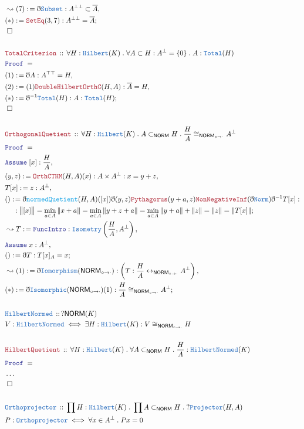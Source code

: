 \documentclass[12pt]{scrartcl}
\newcommand{\TYPE}[1]{\textcolor{NavyBlue}{\mathtt{#1}}}
\newcommand{\FUNC}[1]{\textcolor{Cerulean}{\mathtt{#1}}}
\newcommand{\LOGIC}[1]{\textcolor{Blue}{\mathtt{#1}}}
\newcommand{\THM}[1]{\textcolor{Maroon}{\mathtt{#1}}}
\renewcommand{\.}{\; . \;}
\newcommand{\de}{: \kern 0.1pc =}
\newcommand{\Theorem}[2]{& \THM{#1} \, :: \, #2 \\ & \Proof = \\ }
\newcommand{\DeclareType}[2]{& \TYPE{#1} \, :: \, #2 \\}
\newcommand{\DefineType}[3]{& #1 : \TYPE{#2} \iff #3 \\}
\newcommand{\NewLine}{\\ & \kern 1pc}
\newcommand{\Page}[1]{\begin{align*} #1 \end{align*} \newpage   }
\newcommand{ \bd }{ \ByDef }
\newcommand{\NoProof}{ & \ldots \\ \EndProof}
\newcommand{\ToBij}{\leftrightarrow}
\newcommand{\Say}[3]{& #1 \de #2 : #3, \\}
\newcommand{\Conclude}[3]{& #1 \de #2 : #3; \\}
\newcommand{\Derive}[3]{& \leadsto #1 \de #2 : #3, \\}
\newcommand{\A}{\LOGIC{Assume} \;}
\newcommand{\Assume}[2]{& \A #1 : #2, \\}
\newcommand{\QED}{\; \square}
\newcommand{\EndProof}{& \QED \\}
\newcommand{\ByDef}{\eth}
\newcommand{\Proof}{\LOGIC{Proof} \; }
\newcommand{\Hilbert}{\TYPE{Hilbert}}
\newcommand{\NORM}{\textsf{NORM}}
\newcommand{\NORMI}{{\textsf{NORM}_{\circ \to \cdot}}}
\begin{document}
\Page{
\Derive{(7)}{\bd \TYPE{Subset}}{A^{\bot \bot} \subset \overline{A}}
\Conclude{(*)}{\THM{SetEq}(3,7)}{ A^{\bot \bot} = \overline{A}}
\EndProof
\\
\Theorem{TotalCriterion}{\forall H : \Hilbert(K) \. \forall A \subset H : A^\bot = \{0\} \. A : \TYPE{Total}(H)}
\Say{(1)}{\bd A}{A^{\top\top} = H}
\Say{(2)}{(1)\THM{DoubleHilbertOrthC}(H,A)}{\overline{A} = H}
\Conclude{(*)}{\bd^{-1}\TYPE{Total}(H)}{A : \TYPE{Total}(H)}
\EndProof
\\
\Theorem{OrthogonalQuetient}{\forall H : \Hilbert(K) \. A \subset_\NORM H \. \frac{H}{A} \cong_{\NORMI} A^\bot }
\Assume{[x]}{\frac{H}{A}}
\Say{(y,z)}{\THM{OrthCTHM}(H,A)(x)}{A \times A^\bot : x = y + z}
\Say{T[x]}{z}{A^\bot}
\Conclude{()}{ \bd \FUNC{normedQuetient}(H,A)([x])\bd(y,z)\THM{Pythagorus}(y + a,z) \THM{NonNegativeInf}(\bd \TYPE{Norm} ) \bd^{-1} T[x] 
}{
\NewLine :
 \big\| [x]  \big\| = \min_{a \in A} \| x + a \| =
\min_{a \in A} \| y + z + a  \| = \min_{a \in A} \| y + a \| + \| z \| = \| z \| = \| T[x] \| }
\Derive{T}{\LOGIC{FuncIntro}}{\TYPE{Isometry}\left(  \frac{H}{A}, A^\bot \right)}
\Assume{x}{A^\bot}
\Conclude{()}{\bd T}{T[x]_A = x}
\Derive{(1)}{\bd \TYPE{Iomorphism}(\NORMI)}{\left( T : \frac{H}{A} \ToBij_{\NORMI} A^\bot \right)}
\Conclude{(*)}{\bd \TYPE{Isomorphic}(\NORMI)(1)}{\frac{H}{A} \cong_{\NORMI} A^\bot}
\\
\DeclareType{HilbertNormed}{ ? \NORM(K)}
\DefineType{V}{HilbertNormed}{\exists H : \Hilbert(K) : V \cong_{\NORMI} H }
\\
\Theorem{HilbertQuetient}{\forall H : \Hilbert(K) \. \forall A \subset_{\NORM} H \. 
\frac{H}{A} : \TYPE{HilbertNormed}(K)}
\NoProof
\\
\DeclareType{Orthoprojector}{\prod H: \Hilbert(K) \. \prod A \subset_{\NORM} H \. ?\TYPE{Projector}(H,A)}
\DefineType{P}{Orthoprojector}{\forall x \in A^\bot \. Px = 0}
}
\end{document}
